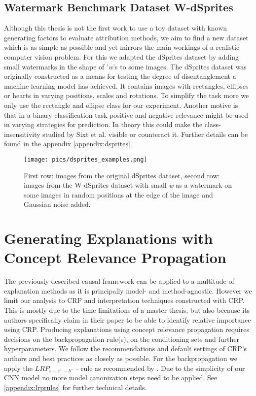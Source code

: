 \subsection{Watermark Benchmark Dataset W-dSprites}\label{section:causal_model}
Although this thesis is not the first work to use a toy dataset with known generating factors to evaluate attribution methods, we aim to find a new dataset which is as simple as possible and yet mirrors the main workings of a realistic computer vision problem. For this we adapted the dSprites dataset \cite{dsprites17} by adding small watermarks in the shape of '\textit{w}'s to some images. The dSprites dataset was originally constructed as a means for testing the degree of disentanglement a machine learning model has achieved. It contains images with rectangles, ellipses or hearts in varying positions, scales and rotations. To simplify the task more we only use the rectangle and ellipse class for our experiment. Another motive is that in a binary classification task positive and negative relevance might be used in varying strategies for prediction. In theory this could make the class-insensitivity studied by Sixt et al. \cite{Sixt2020} visible or counteract it. Further details can be found in the appendix \cref{appendix:dsprites}.

\begin{figure}[t!]
    \centering
    \texttt{[image: pics/dsprites\_examples.png]}
    \caption[Example Images W-dSprites]{First row: images from the original dSprites dataset, second row: images from the W-dSprites dataset with small \textit{w} as a watermark on some images in random positions at the edge of the image and Gaussian noise added.}
    \label{fig:dsprites_examples}
\end{figure}

\section{Generating Explanations with Concept Relevance Propagation}\label{section:explanations_with_crp}
The previously described causal framework can be applied to a multitude of explanation methods as it is principally model- and method-agnostic. However we limit our analysis to CRP and interpretation techniques constructed with CRP. This is mostly due to the time limitations of a master thesis, but also because its authors specifically claim in their paper to be able to identify relative importance using CRP. 
Producing explanations using concept relevance propagation requires decisions on the backpropagation rule(s), on the conditioning sets and further hyperparameters. 
We follow the recommendations and default settings of CRP's authors \cite{Achtibat2022, Achtibat2023} and best practices \cite{Kohlbrenner2020} as closely as possible.
For the backpropagation we apply the $LRP_{\varepsilon -z^+- b^-}$ - rule as recommended by \cite{Kohlbrenner2020}. Due to the simplicity of our CNN model no more model canonization steps need to be applied. See \cref{appendix:lrprules} for further technical details. 

